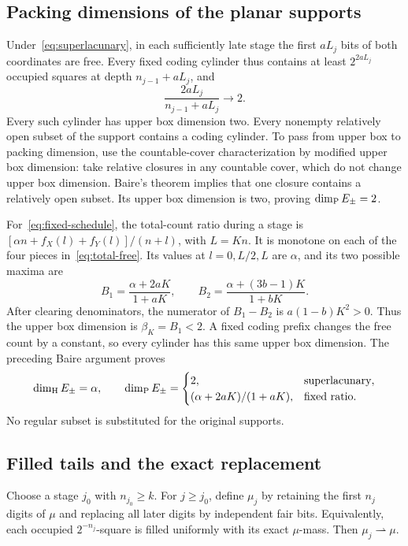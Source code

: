 \subsection{Packing dimensions of the planar supports}
Under~\eqref{eq:superlacunary}, in each sufficiently late stage the first
$aL_j$ bits of both coordinates are free. Every fixed coding cylinder thus
contains at least $2^{2aL_j}$ occupied squares at depth
$n_{j-1}+aL_j$, and
\[
 \frac{2aL_j}{n_{j-1}+aL_j}\longrightarrow2.
\]
Every such cylinder has upper box dimension two. Every nonempty relatively
open subset of the support contains a coding cylinder. To pass from upper
box to packing dimension, use the countable-cover characterization by
modified upper box dimension: take relative closures in any countable
cover, which do not change upper box dimension. Baire's theorem implies
that one closure contains a relatively open subset. Its upper box dimension
is two, proving $\dim_{\mathrm P} E_\pm=2$.

For~\eqref{eq:fixed-schedule}, the total-count ratio during a stage is
$[\alpha n+f_X(l)+f_Y(l)]/(n+l)$, with $L=Kn$. It is monotone on each
of the four pieces in~\eqref{eq:total-free}. Its values at $l=0,L/2,L$
are $\alpha$, and its two possible maxima are
\[
 B_1=\frac{\alpha+2aK}{1+aK},\qquad
 B_2=\frac{\alpha+(3b-1)K}{1+bK}.
\]
After clearing denominators, the numerator of $B_1-B_2$ is
$a(1-b)K^2>0$. Thus the upper box dimension is
$\beta_K=B_1<2$. A fixed coding prefix changes the free count by a constant,
so every cylinder has this same upper box dimension. The preceding Baire
argument proves
\begin{equation}\label{eq:planar-dimensions}
 \dim_{\mathrm H} E_\pm=\alpha,\qquad
 \dim_{\mathrm P} E_\pm=
 \begin{cases}2,&\text{superlacunary},\\
 (\alpha+2aK)/(1+aK),&\text{fixed ratio}.
 \end{cases}
\end{equation}
No regular subset is substituted for the original supports.

\subsection{Filled tails and the exact replacement}
Choose a stage $j_0$ with $n_{j_0}\geq k$. For $j\geq j_0$, define
$\mu_j$ by retaining the first $n_j$ digits of $\mu$ and replacing all
later digits by independent fair bits. Equivalently, each occupied
$2^{-n_j}$-square is filled uniformly with its exact $\mu$-mass.
Then $\mu_j\rightharpoonup\mu$.


